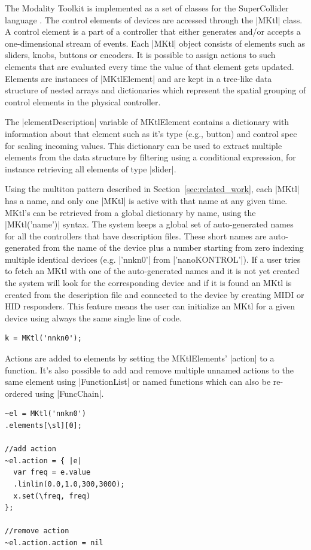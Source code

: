 \documentclass{article}
\begin{document}
The Modality Toolkit is implemented as a set of classes for the SuperCollider language \cite{mccartney2002-ret}. 
The control elements of devices are accessed through the |MKtl| class. 
A control element is a part of a controller that either generates and/or accepts a one-dimensional stream of events. 
Each |MKtl| object consists of elements such as sliders, knobs, buttons or encoders.
It is possible to assign actions to such elements that are evaluated every time the value of that element gets updated.
Elements are instances of |MKtlElement| and are kept in a tree-like data structure of nested arrays and dictionaries which represent the spatial grouping of control elements in the physical controller. 

The |elementDescription| variable of MKtlElement contains a dictionary with information about that element such as it's type (e.g., button) and control spec for scaling incoming values. 
This dictionary can be used to extract multiple elements from the data structure by filtering using a conditional expression, for instance retrieving all elements of type |slider|.

Using the multiton pattern described in Section~\ref{sec:related_work}, each |MKtl| has a name, and only one |MKtl| is active with that name at any given time. 
MKtl's can be retrieved from a global dictionary by name, using the |MKtl('name')| syntax. 
The system keeps a global set of auto-generated names for all the controllers that have description files. These short names are auto-generated from the name of the device plus a number starting from zero indexing multiple identical devices (e.g. |'nnkn0'| from |'nanoKONTROL'|). If a user tries to fetch an MKtl with one of the auto-generated names and it is not yet created the system will look for the corresponding device and if it is found an MKtl is created from the description file and connected to the device by creating MIDI or HID responders. This feature means the user can initialize an MKtl for a given device using always the same single line of code.

\begin{Verbatim}
k = MKtl('nnkn0');
\end{Verbatim}

Actions are added to elements by setting the MKtlElements' |action| to a function.  It's also possible to add and remove multiple unnamed actions to the same element using |FunctionList| or named functions which can also be re-ordered using |FuncChain|.

\begin{Verbatim}
~el = MKtl('nnkn0')
.elements[\sl][0];

//add action
~el.action = { |e|
  var freq = e.value
  .linlin(0.0,1.0,300,3000);
  x.set(\freq, freq)
};

//remove action
~el.action.action = nil
\end{Verbatim}
\end{document}

